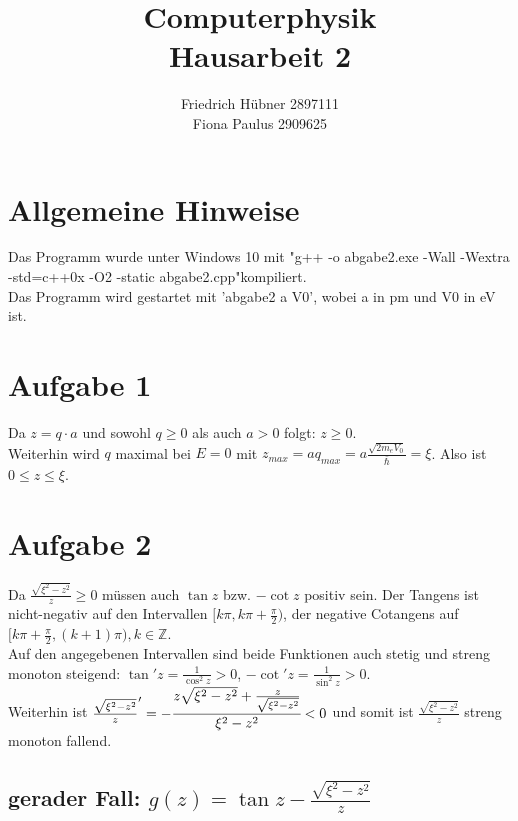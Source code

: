 \documentclass{scrartcl}
\author{Friedrich Hübner 2897111\\
Fiona Paulus 2909625}
\title{Computerphysik\\Hausarbeit 2}
\begin{document}
\maketitle
\newpage

\section*{Allgemeine Hinweise}
Das Programm wurde unter Windows 10 mit "g++ -o abgabe2.exe -Wall -Wextra -std=c++0x -O2 -static abgabe2.cpp"\;kompiliert.\\
Das Programm wird gestartet mit 'abgabe2 a V0', wobei a in pm und V0 in eV ist. 

\section*{Aufgabe 1}
Da $z = q \cdot a$ und sowohl $q\geq 0$ als auch $a > 0$ folgt: $z \geq 0$.\\
Weiterhin wird $q$ maximal bei $E = 0$ mit $z_{max} = a q_{max} = a\frac{\sqrt{2m_eV_0}}{\bar{\hslash}} = \xi$. Also ist $0 \leq z \leq \xi$.

\section*{Aufgabe 2}
Da $\frac{\sqrt{\xi^2-z^2}}{z} \geq 0$ müssen auch $\tan z$ bzw. $-\cot z$ positiv sein. Der Tangens ist nicht-negativ auf den Intervallen $[k\pi, k\pi+\frac{\pi}{2})$, der negative Cotangens auf $[k\pi+\frac{\pi}{2}, (k+1)\pi), k \in \mathbb{Z}$.\\
Auf den angegebenen Intervallen sind beide Funktionen auch stetig und streng monoton steigend: $\tan' z = \frac{1}{\cos^2 z} > 0$, $-\cot' z = \frac{1}{\sin^2 z} > 0$.\\
Weiterhin ist $\frac{\sqrt{\xi^2-z^2}}{z}' = -\cfrac{z\sqrt{\xi^2-z^2} + \frac{z}{\sqrt{\xi^2-z^2}}}{\xi^2-z^2} < 0$ und somit ist $\frac{\sqrt{\xi^2-z^2}}{z}$ streng monoton fallend.\\

\subsection*{gerader Fall: $g(z) = \tan z - \frac{\sqrt{\xi^2-z^2}}{z}$}
\end{document}
